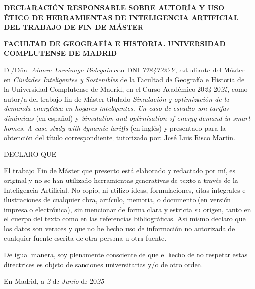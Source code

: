 \documentclass[11pt,a4paper]{book}
\begin{document}
\cleardoublepage
\thispagestyle{empty}
\vspace*{1cm}

\begin{center}
\textbf{DECLARACIÓN RESPONSABLE SOBRE AUTORÍA Y USO ÉTICO DE HERRAMIENTAS DE INTELIGENCIA ARTIFICIAL DEL TRABAJO DE FIN DE MÁSTER}

\vspace{0.5cm}

\textbf{FACULTAD DE GEOGRAFÍA E HISTORIA. UNIVERSIDAD COMPLUTENSE DE MADRID}
\end{center}

\vspace{1.25cm}

D./Dña. \textit{Ainara Larrinaga Bidegain} con DNI \textit{77847232Y}, estudiante del Máster en \textit{Ciudades Inteligentes y Sostenibles} de la Facultad de Geografía e Historia de la Universidad Complutense de Madrid, en el Curso Académico 20\textit{24}-20\textit{25}, como autor/a del trabajo fin de Máster titulado \textit{Simulación y optimización de la demanda energética en hogares inteligentes. Un caso de estudio con tarifas dinámicas} (en español) y \textit{Simulation and optimisation of energy demand in smart homes. A case study with dynamic tariffs} (en inglés) y presentado para la obtención del título correspondiente, tutorizado por: José Luis Risco Martín.
\vspace{1cm}

\noindent DECLARO QUE:
\vspace{0.5cm}

El trabajo Fin de Máster que presento está elaborado y redactado por mí, es original y no se han utilizado herramientas generativas de texto a través de la Inteligencia Artificial. No copio, ni utilizo ideas, formulaciones, citas integrales e ilustraciones de cualquier obra, artículo, memoria, o documento (en versión impresa o electrónica), sin mencionar de forma clara y estricta su origen, tanto en el cuerpo del texto como en las referencias bibliográficas. Así mismo declaro que los datos son veraces y que no he hecho uso de información no autorizada de cualquier fuente escrita de otra persona u otra fuente.

De igual manera, soy plenamente consciente de que el hecho de no respetar estas directrices es objeto de sanciones universitarias y/o de otro orden.
\vspace{2cm}

En Madrid, a \textit{2} de \textit{Junio} de 20\textit{25}
\vspace{2cm}
\end{document}
